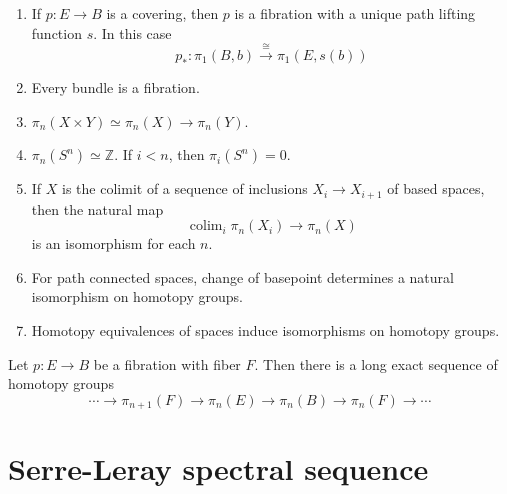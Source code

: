 \begin{prop}
\begin{enumerate}
    \item If $p: E \longrightarrow B$ is a covering, then $p$ is a fibration with a unique path lifting function $s$. In this case $$p_* : \pi_1(B, b) \stackrel{\cong}{\longrightarrow} \pi_1(E, s(b))$$
    \item Every bundle is a fibration.
    \item $\pi_n (X \times Y) \simeq \pi _n (X) \rightarrow \pi_n (Y)$.
    \item $\pi_n (S^n) \simeq \mathbb{Z}$. If $i<n$, then $\pi_i\left(S^n\right)=0$.
    \item If $X$ is the colimit of a sequence of inclusions $X_i \longrightarrow X_{i+1}$ of based spaces, then the natural map
    $$
    \operatorname{colim}_i \pi_n\left(X_i\right) \longrightarrow \pi_n(X)
    $$
    is an isomorphism for each $n$.
    \item For path connected spaces, change of basepoint determines a natural isomorphism on homotopy groups.
    \item Homotopy equivalences of spaces induce isomorphisms on homotopy groups.
\end{enumerate}
\end{prop}

\begin{theo}
    Let $p: E \longrightarrow B$ be a fibration with fiber $F$. Then there is a long exact sequence of homotopy groups
    $$
    \cdots \longrightarrow \pi_{n+1}(F) \longrightarrow \pi_n(E) \longrightarrow \pi_n(B) \longrightarrow \pi_n(F) \longrightarrow \cdots
    $$
    
\end{theo}


\section{Serre-Leray spectral sequence}

